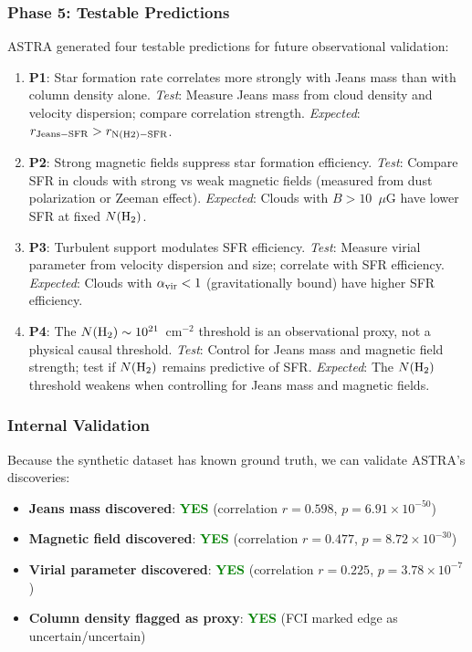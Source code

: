 \documentclass[usenatbib]{rasti}
\begin{document}
\subsubsection{Phase 5: Testable Predictions}

ASTRA generated four testable predictions for future observational validation:

\begin{enumerate}
\item \textbf{P1}: Star formation rate correlates more strongly with Jeans mass than with column density alone. \textit{Test}: Measure Jeans mass from cloud density and velocity dispersion; compare correlation strength. \textit{Expected}: $r_{\rm Jeans-SFR} > r_{\rm N(H2)-SFR}$.

\item \textbf{P2}: Strong magnetic fields suppress star formation efficiency. \textit{Test}: Compare SFR in clouds with strong vs weak magnetic fields (measured from dust polarization or Zeeman effect). \textit{Expected}: Clouds with $B > 10$~$\mu$G have lower SFR at fixed $N({\rm H_2})$.

\item \textbf{P3}: Turbulent support modulates SFR efficiency. \textit{Test}: Measure virial parameter from velocity dispersion and size; correlate with SFR efficiency. \textit{Expected}: Clouds with $\alpha_{\rm vir} < 1$ (gravitationally bound) have higher SFR efficiency.

\item \textbf{P4}: The $N({\rm H_2}) \sim 10^{21}$~cm$^{-2}$ threshold is an observational proxy, not a physical causal threshold. \textit{Test}: Control for Jeans mass and magnetic field strength; test if $N({\rm H_2})$ remains predictive of SFR. \textit{Expected}: The $N({\rm H_2})$ threshold weakens when controlling for Jeans mass and magnetic fields.
\end{enumerate}

\subsubsection{Internal Validation}

Because the synthetic dataset has known ground truth, we can validate ASTRA's discoveries:

\begin{itemize}
\item \textbf{Jeans mass discovered}: \textcolor{green}{\textbf{YES}} (correlation $r=0.598$, $p=6.91\times10^{-50}$)
\item \textbf{Magnetic field discovered}: \textcolor{green}{\textbf{YES}} (correlation $r=0.477$, $p=8.72\times10^{-30}$)
\item \textbf{Virial parameter discovered}: \textcolor{green}{\textbf{YES}} (correlation $r=0.225$, $p=3.78\times10^{-7}$)
\item \textbf{Column density flagged as proxy}: \textcolor{green}{\textbf{YES}} (FCI marked edge as uncertain/uncertain)
\end{itemize}
\end{document}
